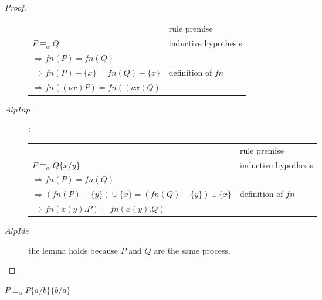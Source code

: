 \begin{lemma}
\begin{proof}
\begin{description}
\begin{center}
	  \begin{tabular}{ll}
	    &rule premise\\
	    $P\equiv_{\alpha}Q$&inductive hypothesis\\
	    $\Rightarrow fn(P)=fn(Q)$&\\
	    $\Rightarrow fn(P)- \{x\}=fn(Q)- \{x\}$&definition of $fn$\\
	    $\Rightarrow fn((\nu x)P)=fn((\nu x)Q)$&\\
	  \end{tabular}
	\end{center}
      \item[$AlpInp$]:
	\begin{center}
	  \begin{tabular}{ll}
	    &rule premise\\
	    $P\equiv_{\alpha}Q\{x/y\}$&inductive hypothesis\\
	    $\Rightarrow fn(P)=fn(Q)$&\\
	    $\Rightarrow (fn(P)-\{y\})\cup \{x\}=(fn(Q)-\{y\})\cup \{x\}$&definition of $fn$\\
	    $\Rightarrow fn(x(y).P)=fn(x(y).Q)$&\\
	  \end{tabular}
	\end{center}
      \item[$AlpIde$]
	the lemma holds because $P$ and $Q$ are the same process.
    \end{description}
  \end{proof}
\end{lemma}


\begin{lemma}\label{alphaequivalenceSubstitutionInversion}
  $P \equiv_{\alpha} P\{a/b\}\{b/a\}$
\end{lemma}


